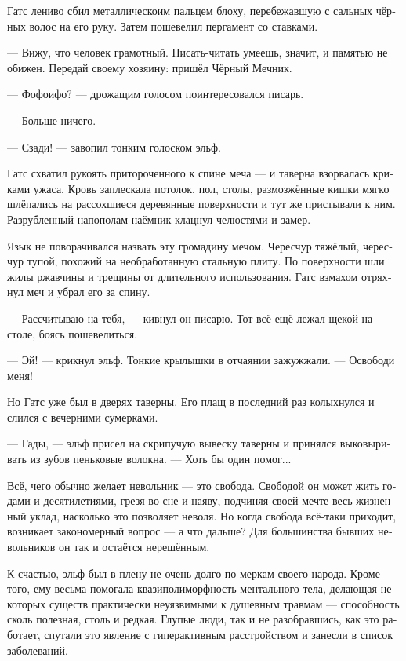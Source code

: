 \documentclass[a4paper,12pt,fleqn]{book}\usepackage{polyglossia}\setdefaultlanguage[babelshorthands=true]{russian}\setotherlanguage{english}\defaultfontfeatures{Ligatures=TeX,Mapping=tex-text}\usepackage{xcolor}\newcommand{\ml}[3]{#2}
\newcommand{\asterism}{\vspace{1em}{\centering\Large\bfseries$\ast~\ast~\ast$\par}\vspace{1em}}
\begin{document}
Гатс лениво сбил металлическоим пальцем блоху, перебежавшую с сальных чёрных волос на его руку.
Затем пошевелил пергамент со ставками.

--- Вижу, что человек грамотный.
Писать-читать умеешь, значит, и памятью не обижен.
Передай своему хозяину: пришёл Чёрный Мечник.

--- Фофоифо? --- дрожащим голосом поинтересовался писарь.

--- Больше ничего.

--- Сзади! --- завопил тонким голоском эльф.

Гатс схватил рукоять притороченного к спине меча --- и таверна взорвалась криками ужаса.
Кровь заплескала потолок, пол, столы, размозжённые кишки мягко шлёпались на рассохшиеся деревянные поверхности и тут же пристывали к ним.
Разрубленный напополам наёмник клацнул челюстями и замер.

Язык не поворачивался назвать эту громадину мечом.
Чересчур тяжёлый, чересчур тупой, похожий на необработанную стальную плиту.
По поверхности шли жилы ржавчины и трещины от длительного использования.
Гатс взмахом отряхнул меч и убрал его за спину.

--- Рассчитываю на тебя, --- кивнул он писарю.
Тот всё ещё лежал щекой на столе, боясь пошевелиться.

--- Эй! --- крикнул эльф.
Тонкие крылышки в отчаянии зажужжали.
--- Освободи меня!

Но Гатс уже был в дверях таверны.
Его плащ в последний раз колыхнулся и слился с вечерними сумерками.

\asterism

--- Гады, --- эльф присел на скрипучую вывеску таверны и принялся выковыривать из зубов пеньковые волокна.
--- Хоть бы один помог...

Всё, чего обычно желает невольник --- это свобода.
Свободой он может жить годами и десятилетиями, грезя во сне и наяву, подчиняя своей мечте весь жизненный уклад, насколько это позволяет неволя.
Но когда свобода всё-таки приходит, возникает закономерный вопрос --- а что дальше?
Для большинства бывших невольников он так и остаётся нерешённым.

К счастью, эльф был в плену не очень долго по меркам своего народа.
Кроме того, ему весьма помогала квазиполиморфность ментального тела, делающая некоторых существ практически неуязвимыми к душевным травмам --- способность сколь полезная, столь и редкая.
Глупые люди, так и не разобравшись, как это работает, спутали это явление с гиперактивным расстройством и занесли в список заболеваний.
\end{document}
